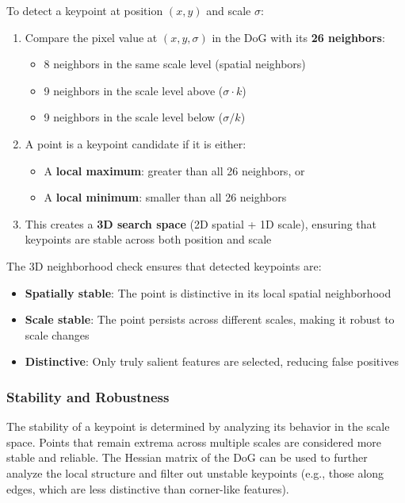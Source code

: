 \documentclass[11pt,a4paper]{article}
\theoremstyle{definition}
\theoremstyle{plain}
\theoremstyle{remark}
\begin{document}
\begin{tcolorbox}[colback=orange!5!white,colframe=orange!75!black,title=\textbf{Extrema Detection Process}]
To detect a keypoint at position $(x, y)$ and scale $\sigma$:
\begin{enumerate}
    \item Compare the pixel value at $(x, y, \sigma)$ in the DoG with its \textbf{26 neighbors}:
    \begin{itemize}
        \item 8 neighbors in the same scale level (spatial neighbors)
        \item 9 neighbors in the scale level above ($\sigma \cdot k$)
        \item 9 neighbors in the scale level below ($\sigma / k$)
    \end{itemize}
    \item A point is a keypoint candidate if it is either:
    \begin{itemize}
        \item A \textbf{local maximum}: greater than all 26 neighbors, or
        \item A \textbf{local minimum}: smaller than all 26 neighbors
    \end{itemize}
    \item This creates a \textbf{3D search space} (2D spatial + 1D scale), ensuring that keypoints are stable across both position and scale
\end{enumerate}
\end{tcolorbox}

The 3D neighborhood check ensures that detected keypoints are:
\begin{itemize}
    \item \textbf{Spatially stable}: The point is distinctive in its local spatial neighborhood
    \item \textbf{Scale stable}: The point persists across different scales, making it robust to scale changes
    \item \textbf{Distinctive}: Only truly salient features are selected, reducing false positives
\end{itemize}

\subsubsection{Stability and Robustness}

The stability of a keypoint is determined by analyzing its behavior in the scale space. Points that remain extrema across multiple scales are considered more stable and reliable. The Hessian matrix of the DoG can be used to further analyze the local structure and filter out unstable keypoints (e.g., those along edges, which are less distinctive than corner-like features).
\end{document}
